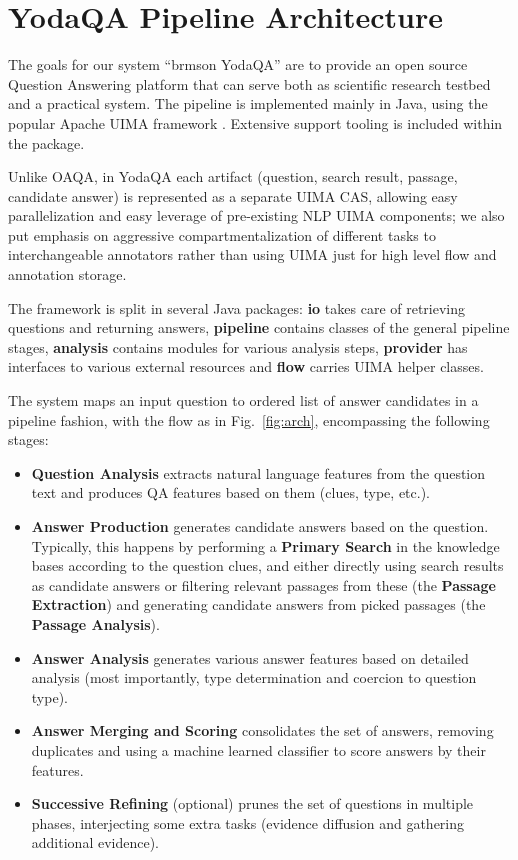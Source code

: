 \documentclass{poster15}
\begin{document}
\section{YodaQA Pipeline Architecture}
\label{sec:yodaqaarch}

The goals for our system ``brmson YodaQA'' are to provide an open source
Question Answering platform that can serve both as scientific research
testbed and a practical system. The pipeline is implemented mainly in Java,
using the popular Apache UIMA framework \cite{UIMA}.  Extensive support
tooling is included within the package.

Unlike OAQA, in YodaQA each artifact (question, search result, passage,
candidate answer) is represented as a separate UIMA CAS, allowing easy
parallelization and easy leverage of pre-existing NLP UIMA components;
we also put emphasis on aggressive compartmentalization
of different tasks to interchangeable annotators rather than using
UIMA just for high level flow and annotation storage.

The framework is split in several Java packages: \textbf{io} takes care
of retrieving questions and returning answers, \textbf{pipeline} contains
classes of the general pipeline stages, \textbf{analysis} contains
modules for various analysis steps, \textbf{provider} has interfaces
to various external resources and \textbf{flow} carries UIMA helper classes.

The system maps an input question to ordered list of answer candidates in a pipeline fashion,
with the flow as in Fig.~\ref{fig:arch}, encompassing the following stages:

\begin{itemize}
\item \textbf{Question Analysis} extracts natural language features from the question text and produces QA features based on them (clues, type, etc.).
\item \textbf{Answer Production} generates candidate answers based on the question.
	Typically, this happens by performing a \textbf{Primary Search} in the knowledge bases according to the question clues,
	and either directly using search results as candidate answers
	or filtering relevant passages from these (the \textbf{Passage Extraction})
	and generating candidate answers from picked passages (the \textbf{Passage Analysis}).
\item \textbf{Answer Analysis} generates various answer features based on detailed analysis (most importantly, type determination and coercion to question type).
\item \textbf{Answer Merging and Scoring} consolidates the set of answers, removing duplicates and using a machine learned classifier to score answers by their features.
\item \textbf{Successive Refining} (optional) prunes the set of questions in multiple phases, interjecting some extra tasks (evidence diffusion and gathering additional evidence).
\end{itemize}
\end{document}

